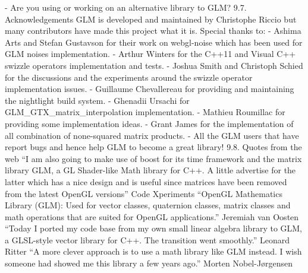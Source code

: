 \documentclass{scrartcl}
\numberwithin{figure}{subsection}
\begin{document}
- Are you using or working on an alternative library to GLM?
9.7. Acknowledgements
GLM is developed and maintained by Christophe Riccio but many contributors have made this project what it is.
Special thanks to:
- Ashima Arts and Stefan Gustavson for their work on webgl-noise which has been used for GLM noises implementation.
- Arthur Winters for the C++11 and Visual C++ swizzle operators implementation and tests.
- Joshua Smith and Christoph Schied for the discussions and the experiments around the swizzle operator implementation issues.
- Guillaume Chevallereau for providing and maintaining the nightlight build system.
- Ghenadii Ursachi for GLM_GTX_matrix_interpolation implementation.
- Mathieu Roumillac for providing some implementation ideas.
- Grant James for the implementation of all combination of none-squared matrix products.
- All the GLM users that have report bugs and hence help GLM to become a great library!
9.8. Quotes from the web
“I am also going to make use of boost for its time framework and the matrix library GLM, a GL Shader-like Math library for C++. A little advertise for the latter which has a nice design and is useful since matrices have been removed from the latest OpenGL versions”
Code Xperiments
“OpenGL Mathematics Library (GLM): Used for vector classes, quaternion classes, matrix classes and math operations that are suited for OpenGL applications.”
Jeremiah van Oosten
“Today I ported my code base from my own small linear algebra library to GLM, a GLSL-style vector library for C++. The transition went smoothly.”
Leonard Ritter
“A more clever approach is to use a math library like GLM instead. I wish someone had showed me this library a few years ago.”
Morten Nobel-Jørgensen

\fi
\end{document}
